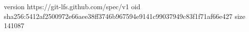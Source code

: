 version https://git-lfs.github.com/spec/v1
oid sha256:5412af2500972e66aee38ff3746b967594e9141c99037949c83f1f71af66e427
size 141087
